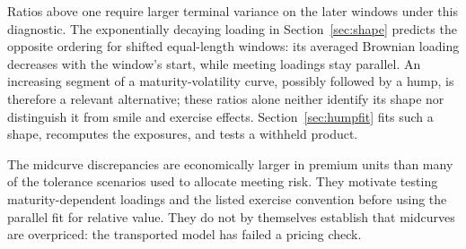 Ratios above one require larger terminal variance on the later windows under this diagnostic. The exponentially decaying loading in Section~\ref{sec:shape} predicts the opposite ordering for shifted equal-length windows: its averaged Brownian loading decreases with the window's start, while meeting loadings stay parallel. An increasing segment of a maturity-volatility curve, possibly followed by a hump, is therefore a relevant alternative; these ratios alone neither identify its shape nor distinguish it from smile and exercise effects. Section~\ref{sec:humpfit} fits such a shape, recomputes the exposures, and tests a withheld product.

The midcurve discrepancies are economically larger in premium units than many of the tolerance scenarios used to allocate meeting risk. They motivate testing maturity-dependent loadings and the listed exercise convention before using the parallel fit for relative value. They do not by themselves establish that midcurves are overpriced: the transported model has failed a pricing check.



